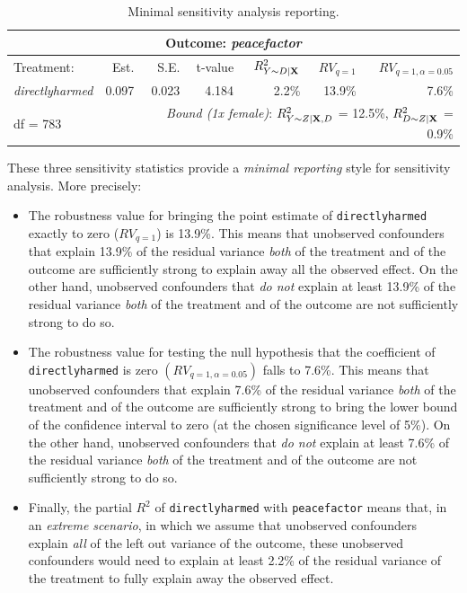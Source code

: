 \documentclass[
]{jss}
\begin{document}
\begin{table}
\centering
\begin{tabular}{lrrrrrr}
\multicolumn{7}{c}{Outcome: \textit{peacefactor}} \\
\hline \hline 
Treatment: & Est. & S.E. & t-value & $R^2_{Y \sim D |{\bf X}}$ & $RV_{q = 1}$ & $RV_{q = 1, \alpha = 0.05}$  \\ 
\hline 
\textit{directlyharmed} & 0.097 & 0.023 & 4.184 & 2.2\% & 13.9\% & 7.6\% \\ 
\hline 
df = 783 & & \multicolumn{5}{r}{ \small \textit{Bound (1x female)}: $R^2_{Y\sim Z| {\bf X}, D}$ = 12.5\%, $R^2_{D\sim Z| {\bf X} }$ = 0.9\%} \\
\end{tabular}
\caption{Minimal sensitivity analysis reporting.}
\label{tab:minimal}
\end{table}

These three sensitivity statistics provide a \emph{minimal reporting}
style for sensitivity analysis. More precisely:

\begin{itemize}
\item
  The robustness value for bringing the point estimate of
  \texttt{directlyharmed} exactly to zero (\(RV_{q=1}\)) is 13.9\%. This
  means that unobserved confounders that explain 13.9\% of the residual
  variance \emph{both} of the treatment and of the outcome are
  sufficiently strong to explain away all the observed effect. On the
  other hand, unobserved confounders that \emph{do not} explain at least
  13.9\% of the residual variance \emph{both} of the treatment and of
  the outcome are not sufficiently strong to do so.
\item
  The robustness value for testing the null hypothesis that the
  coefficient of \texttt{directlyharmed} is zero
  \((RV_{q =1, \alpha = 0.05})\) falls to 7.6\%. This means that
  unobserved confounders that explain 7.6\% of the residual variance
  \emph{both} of the treatment and of the outcome are sufficiently
  strong to bring the lower bound of the confidence interval to zero (at
  the chosen significance level of 5\%). On the other hand, unobserved
  confounders that \emph{do not} explain at least 7.6\% of the residual
  variance \emph{both} of the treatment and of the outcome are not
  sufficiently strong to do so.
\item
  Finally, the partial \(R^2\) of \texttt{directlyharmed} with
  \texttt{peacefactor} means that, in an \emph{extreme scenario}, in
  which we assume that unobserved confounders explain \emph{all} of the
  left out variance of the outcome, these unobserved confounders would
  need to explain at least 2.2\% of the residual variance of the
  treatment to fully explain away the observed effect.
\end{itemize}
\end{document}
